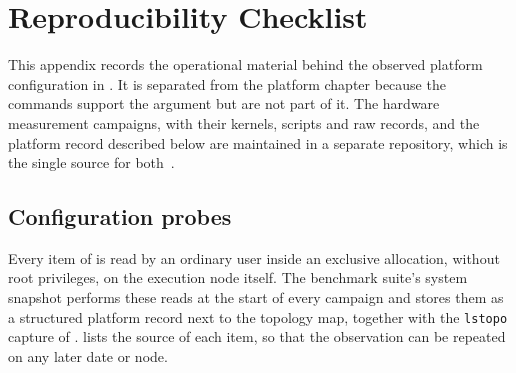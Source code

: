 \chapter{Reproducibility Checklist}
\label{app:reproducibility}

This appendix records the operational material behind the observed
platform configuration in .  It is
separated from the platform chapter because the commands support the
argument but are not part of it.  The hardware measurement campaigns,
with their kernels, scripts and raw records, and the platform record
described below are maintained in a separate repository, which is the
single source for both~\cite{hwbench2026}.

\section{Configuration probes}
\label{app:configuration-probes}

Every item of  is read by an ordinary user
inside an exclusive allocation, without root privileges, on the
execution node itself.  The benchmark suite's system snapshot performs
these reads at the start of every campaign and stores them as a
structured platform record next to the topology map, together with the
\texttt{lstopo} capture of .
 lists the source of each item, so that
the observation can be repeated on any later date or node.

